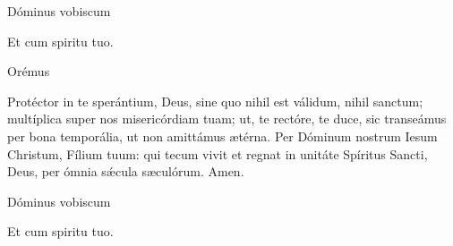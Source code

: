 


\rubric{\Vbar} Dóminus vobiscum

\rubric{\Rbar} Et cum spiritu tuo.

Orémus

Protéctor in te sperántium, Deus, sine quo nihil est válidum, nihil sanctum; multíplica super nos misericórdiam tuam; ut, te rectóre, te duce, sic transeámus per bona temporália, ut non amittámus ætérna. Per Dóminum nostrum Iesum Christum, Fílium tuum: qui tecum vivit et regnat in unitáte Spíritus Sancti, Deus, per ómnia sǽcula sæculórum. \rubric{\Rbar} Amen.

\rubric{\Vbar} Dóminus vobiscum

\rubric{\Rbar} Et cum spiritu tuo.
